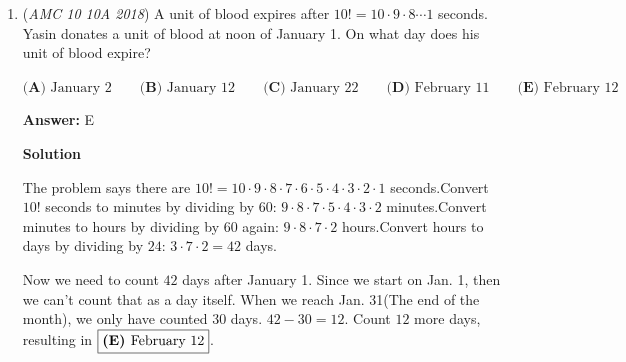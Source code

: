 \begin{enumerate}
 
 \textbf{Answer: }A



\textbf{Solution 1}

Let's assume that Jacqueline has $1$ gallon(s) of soda. Then Alice has $1.25$ gallons and Liliane has $1.5$ gallons. Doing division, we find out that $\frac{1.5}{1.25}=1.2$, which means that Liliane has $20\%$ more soda. Therefore, the answer is $\boxed{\textbf{(A)}}$.

 



\textbf{Solution 2}

WLOG, lets use $4$ gallons instead of $1$. When you work it out, you get $6$ gallons and $5$ gallons. We have $6 - 5 = 1$ is $20\%$ of $5$. Thus, we reach $\boxed{\textbf{(A)}}$.

 



\textbf{Solution 3}

If Jacqueline has $x$ gallons of soda, Alice has $1.25x$ gallons, and Liliane has $1.5x$ gallons. Thus, the answer is $\frac{1.5}{1.25}=1.2$ $=>$ Liliane has $20\%$ more soda. Our answer is $\boxed{\textbf{(A)}}$.

 Education, the Study of Everything

 


 


 


	\item (\textit{AMC 10 10A 2018}) A unit of blood expires after $10!=10\cdot 9 \cdot 8 \cdots 1$ seconds. Yasin donates a unit of blood at noon of January 1. On what day does his unit of blood expire?


 $\textbf{(A) }\text{January 2}\qquad\textbf{(B) }\text{January 12}\qquad\textbf{(C) }\text{January 22}\qquad\textbf{(D) }\text{February 11}\qquad\textbf{(E) }\text{February 12}$

 \textbf{Answer: }E



\textbf{Solution}

The problem says there are $10! = 10\cdot 9\cdot 8\cdot 7\cdot 6\cdot 5\cdot 4\cdot 3\cdot 2\cdot 1$ seconds.Convert $10!$ seconds to minutes by dividing by $60$: $9\cdot 8\cdot 7\cdot 5\cdot 4\cdot 3\cdot 2$ minutes.Convert minutes to hours by dividing by $60$ again: $9\cdot 8\cdot 7\cdot 2$ hours.Convert hours to days by dividing by $24$: $3\cdot 7\cdot 2 = 42$ days.

 Now we need to count $42$ days after January 1. Since we start on Jan. 1, then we can't count that as a day itself. When we reach Jan. 31(The end of the month), we only have counted 30 days. $42 - 30 = 12$. Count $12$ more days, resulting in $\fbox{\textbf{(E) }\text{February 12}}$.


\end{enumerate}
